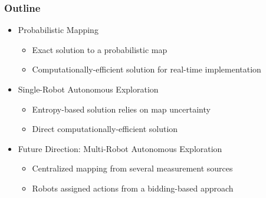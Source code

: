 \documentclass[11pt,professionalfonts,hyperref={pdftex,pdfpagemode=none,pdfstartview=FitH}]{beamer}
\begin{document}
\begin{frame}
\frametitle{Outline}
\begin{itemize}
	\item Probabilistic Mapping
	\begin{itemize}
    		\item Exact solution to a probabilistic map
		\item Computationally-efficient solution for real-time implementation
	\end{itemize}
	\item Single-Robot Autonomous Exploration
	\begin{itemize}
    		\item Entropy-based solution relies on map uncertainty
		\item Direct computationally-efficient solution
	\end{itemize}
	\item Future Direction: Multi-Robot Autonomous Exploration
	\begin{itemize}
		\item Centralized mapping from several measurement sources
		\item Robots assigned actions from a bidding-based approach
	\end{itemize}
\end{itemize}
\end{frame}

\section*{}

\begin{frame}
\frametitle{}
{}
\end{frame}
\end{document}
